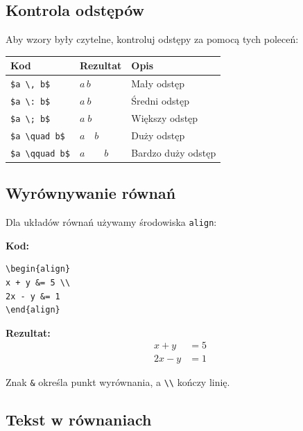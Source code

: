 \documentclass[
  polish,
  letterpaper,
  DIV=11,
  numbers=noendperiod]{scrreprt}
\newcounter{none} %
\begin{document}
\subsection{Kontrola odstępów}\label{kontrola-odstux119puxf3w}

Aby wzory były czytelne, kontroluj odstępy za pomocą tych poleceń:

{\def\LTcaptype{none} %
\begin{longtable}[]{@{}lll@{}}
\toprule\noalign{}
Kod & Rezultat & Opis \\
\midrule\noalign{}
\endhead
\bottomrule\noalign{}
\endlastfoot
\texttt{\$a\ \textbackslash{},\ b\$} & \(a \, b\) & Mały odstęp \\
\texttt{\$a\ \textbackslash{}:\ b\$} & \(a \: b\) & Średni odstęp \\
\texttt{\$a\ \textbackslash{};\ b\$} & \(a \; b\) & Większy odstęp \\
\texttt{\$a\ \textbackslash{}quad\ b\$} & \(a \quad b\) & Duży odstęp \\
\texttt{\$a\ \textbackslash{}qquad\ b\$} & \(a \qquad b\) & Bardzo duży
odstęp \\
\end{longtable}
}

\subsection{Wyrównywanie równań}\label{wyruxf3wnywanie-ruxf3wnaux144}

Dla układów równań używamy środowiska \texttt{align}:

\textbf{Kod:}

\begin{verbatim}
\begin{align}
x + y &= 5 \\
2x - y &= 1
\end{align}
\end{verbatim}

\textbf{Rezultat:} \begin{align}
x + y &= 5 \\
2x - y &= 1
\end{align}

Znak \texttt{\&} określa punkt wyrównania, a
\texttt{\textbackslash{}\textbackslash{}} kończy linię.

\subsection{Tekst w równaniach}\label{tekst-w-ruxf3wnaniach}
\end{document}
